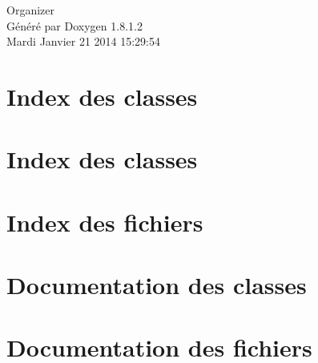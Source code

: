 \documentclass{book}
\begin{document}
\begin{titlepage}
\vspace*{7cm}
\begin{center}
{\Large Organizer }\\
\vspace*{1cm}
{\large Généré par Doxygen 1.8.1.2}\\
\vspace*{0.5cm}
{\small Mardi Janvier 21 2014 15:29:54}\\
\end{center}
\end{titlepage}
\clearemptydoublepage
{}
\tableofcontents
\clearemptydoublepage
{}
\chapter{Index des classes}

\chapter{Index des classes}

\chapter{Index des fichiers}

\chapter{Documentation des classes}








\chapter{Documentation des fichiers}








\printindex
\end{document}

